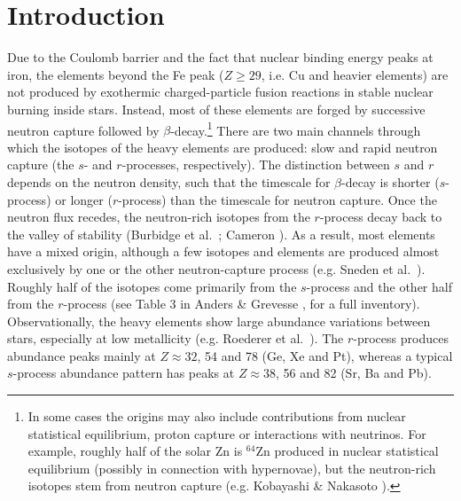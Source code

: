 \documentclass[traditabstract]{aa}
\begin{document}
\maketitle
%

\section{Introduction}

Due to the Coulomb barrier and the fact that nuclear binding energy peaks at iron, the elements beyond the Fe peak ($Z\geq 29$, i.e. Cu and heavier elements) are not produced by exothermic charged-particle fusion reactions in stable nuclear burning inside stars. Instead, most of these elements are forged by successive neutron capture followed by $\beta$-decay.\footnote{In some cases the origins may also include contributions from nuclear statistical equilibrium, proton capture or interactions with neutrinos. For example, roughly half of the solar Zn is $^{64}$Zn produced in nuclear statistical equilibrium (possibly in connection with hypernovae), but the neutron-rich isotopes stem from neutron capture (e.g. Kobayashi \& Nakasoto \cite{2011ApJ...729...16K}).}  There are two main channels through which the isotopes of the heavy elements are produced: slow and rapid neutron capture (the $s$- and $r$-processes, respectively).  The distinction between $s$ and $r$ depends on the neutron density, such that the timescale for $\beta$-decay is shorter ($s$-process) or longer ($r$-process) than the timescale for neutron capture.  Once the neutron flux recedes, the neutron-rich isotopes from the $r$-process decay back to the valley of stability (Burbidge et al.\ \cite{1957RvMP...29..547B}; Cameron \cite{1957AJ.....62....9C}). 
As a result, most elements have a mixed origin, although a few isotopes and elements are produced almost exclusively by one or the other neutron-capture process (e.g. Sneden et al.\ \cite{2008ARA&A..46..241S}). Roughly half of the isotopes come primarily from the $s$-process and the other half from the $r$-process (see Table 3 in Anders \& Grevesse \cite{ag89}, for a full inventory). 
Observationally, the heavy elements show large abundance variations between stars, especially at low metallicity (e.g. Roederer et al.\ \cite{2014ApJ...784..158R}). 
The $r$-process produces abundance peaks mainly at \mbox{$Z\approx 32$}, 54 and 78 (Ge, Xe and Pt), whereas a typical $s$-process abundance pattern has peaks at $Z\approx 38$, 56 and 82 (Sr, Ba and Pb). 
\end{document}
